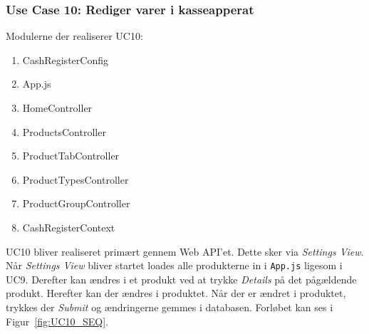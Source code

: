 \subsubsection{Use Case 10: Rediger varer i kasseapperat}
Modulerne der realiserer UC10:
\begin{enumerate}
	\item CashRegisterConfig
	\item App.js
	\item HomeController
	\item ProductsController
	\item ProductTabController
	\item ProductTypesController
	\item ProductGroupController
	\item CashRegisterContext
\end{enumerate}

UC10 bliver realiseret primært gennem Web API'et. Dette sker via \textit{Settings View}. Når \textit{Settings View} bliver startet loades alle produkterne in i \texttt{App.js} ligesom i UC9. Derefter kan ændres i et produkt ved at trykke \textit{Details} på det pågældende produkt. Herefter kan der ændres i produktet. Når der er ændret i produktet, trykkes der \textit{Submit} og ændringerne gemmes i databasen. Forløbet kan ses i Figur~\ref{fig:UC10_SEQ}.

